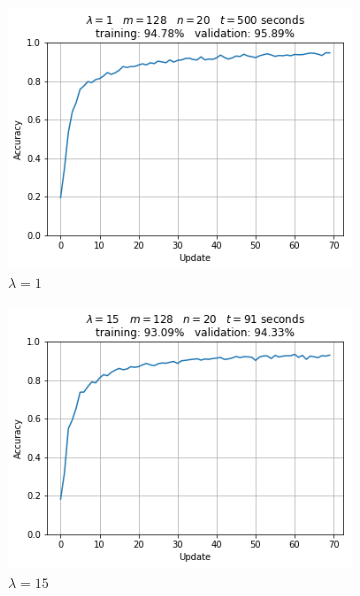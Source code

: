 \begin{figure}[H]
  \centering
  \begin{subfigure}{.32\textwidth}
    \centering
    \includegraphics[width=\textwidth]{resources/images/aeasgd_val_1}
    \caption{$\lambda = 1$}
  \end{subfigure}
  \begin{subfigure}{.32\textwidth}
    \centering
    \includegraphics[width=\textwidth]{resources/images/aeasgd_val_15}
    \caption{$\lambda = 15$}
  \end{subfigure}
  \begin{subfigure}{.32\textwidth}
    \centering

\end{subfigure}
\end{figure}
